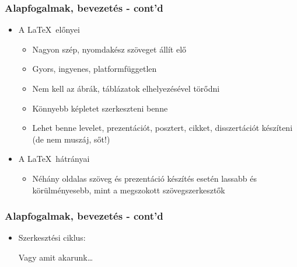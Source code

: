 \documentclass[t,aspectratio=169]{beamer}
\begin{document}
\begin{frame}
\frametitle{Alapfogalmak, bevezetés - cont'd}
\begin{itemize}
\setlength{\parskip}{0pt}
\setlength{\itemsep}{0pt}
\item A \LaTeX\ előnyei 
\begin{itemize}
\item Nagyon szép, nyomdakész szöveget állít elő
\item Gyors, ingyenes, platformfüggetlen
\item Nem kell az ábrák, táblázatok elhelyezésével tö\-rőd\-ni
\item Könnyebb képletet szerkeszteni benne
\item Lehet benne levelet, prezentációt, posztert, cikket, disszertációt készíteni (de nem muszáj, sőt!)
\end{itemize}
\item A \LaTeX\ hátrányai
\begin{itemize}
\item Néhány oldalas szöveg és prezentáció készítés esetén lassabb és kö\-rül\-mé\-nye\-sebb, mint a meg\-szo\-kott szö\-veg\-szer\-kesz\-tők
\end{itemize}
\end{itemize}
\end{frame}


\begin{frame}
\frametitle{Alapfogalmak, bevezetés - cont'd}
\begin{itemize}
\setlength{\parskip}{0pt}
\setlength{\itemsep}{0pt}
\item Szerkesztési ciklus: 
\bigskip
{}
\bigskip
Vagy amit akarunk\dots
\end{itemize}
\end{frame}
\end{document}
